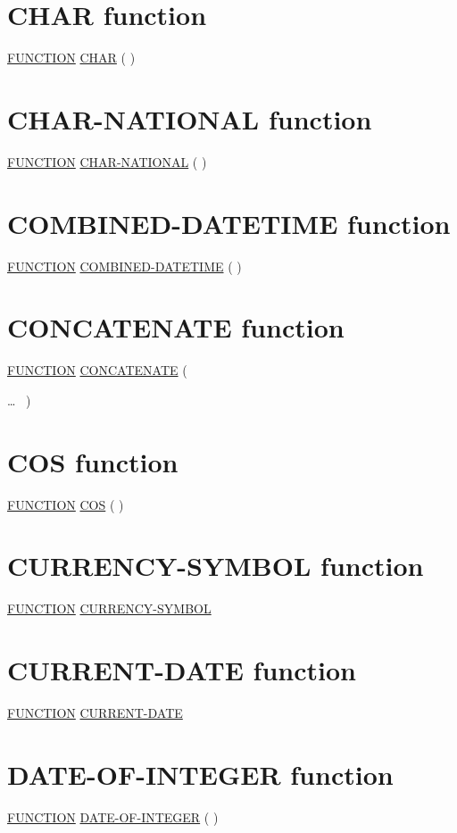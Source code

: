 \documentclass[a4paper,oneside,svgnames]{scrbook}
\makeatletter
\newcommand{\key}[1]{\underline{#1}}
\newcommand{\gnucobol}[1]{%
  \colorbox{orange!75}{#1}}
\newcommand{\pending}[1]{%
  \textcolor{gray!75}{#1}}
\newenvironment{1=}{$\left\{ \begin{tabular}{@{}l@{}}}{\end{tabular} \right\}$}
\makeatother
\begin{document}
\section{CHAR function}

\key{FUNCTION} \key{CHAR} ( \argument )

\section{CHAR-NATIONAL function}

\pending{
  \key{FUNCTION} \key{CHAR-NATIONAL} ( \argument )
}

\section{COMBINED-DATETIME function}

\key{FUNCTION} \key{COMBINED-DATETIME} ( \argument \argument )

\section{CONCATENATE function}

\key{FUNCTION} \key{CONCATENATE} (
\begin{1=}
  \argument
\end{1=}
\ldots
\ {})

\section{COS function}

\key{FUNCTION} \key{COS} ( \argument )

\section{CURRENCY-SYMBOL function}

\gnucobol{
  \key{FUNCTION} \key{CURRENCY-SYMBOL}
}

\section{CURRENT-DATE function}

\key{FUNCTION} \key{CURRENT-DATE}

\section{DATE-OF-INTEGER function}

\key{FUNCTION} \key{DATE-OF-INTEGER} ( \argument )
\end{document}
